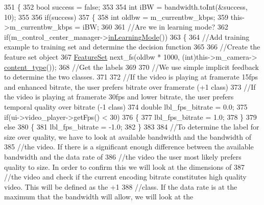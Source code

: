 \begin{DoxyCode}
351 \{
352     \textcolor{keywordtype}{bool} success = \textcolor{keyword}{false};
353 
354     \textcolor{keywordtype}{int} iBW = bandwidth.toInt(&success, 10);
355 
356     \textcolor{keywordflow}{if}(success)
357     \{
358         \textcolor{keywordtype}{int} oldbw = m\_currentbw\_kbps;
359         this->m\_currentbw\_kbps = iBW;
360 
361         \textcolor{comment}{//Are we in learning mode?}
362         \textcolor{keywordflow}{if}(m\_control\_center\_manager->\hyperlink{classIControlCenterManager_ab4f6172f09c27b73254ed7fcfe716790}{inLearningMode}())
363         \{
364             \textcolor{comment}{//Add training example to training set and determine the decision function}
365 
366             \textcolor{comment}{//Create the feature set object}
367             \hyperlink{classFeatureSet}{FeatureSet} next\_fs(oldbw * 1000, (\textcolor{keywordtype}{int})this->m\_camera->
      \hyperlink{classCamera_aafe2614c711fb5465dacaeea55e12f64}{content\_type}());
368             \textcolor{comment}{//Get the labels}
369 
370             \textcolor{comment}{//We use simple implicit feedback to determine the two classes.}
371 
372             \textcolor{comment}{//If the video is playing at framerate 15fps and enhanced bitrate, the user prefers bitrate
       over framerate (+1 class)}
373             \textcolor{comment}{//If the video is playing at framerate 30fps and lower bitrate, the user prefers temporal
       quality over bitrate (-1 class)}
374             \textcolor{keywordtype}{double} lbl\_fps\_bitrate = 0.0;
375             \textcolor{keywordflow}{if}(ui->video\_player->getFps() < 30)
376             \{
377                 lbl\_fps\_bitrate = 1.0;
378             \}
379             \textcolor{keywordflow}{else}
380             \{
381                 lbl\_fps\_bitrate = -1.0;
382             \}
383 
384             \textcolor{comment}{//To determine the label for size over quality, we have to look at available bandwidth and the
       bandwidth of}
385             \textcolor{comment}{//the video. If there is a significant enough difference between the available bandwidth and
       the data rate of}
386             \textcolor{comment}{//the video the user most likely prefers quality to size. In order to confirm this we will look
       at the dimensions of}
387             \textcolor{comment}{//the video and check if the current encoding bitrate constitutes high quality video. This will
       be defined as the +1}
388             \textcolor{comment}{//class. If the data rate is at the maximum that the bandwidth will allow, we will look at the
}
\end{DoxyCode}
